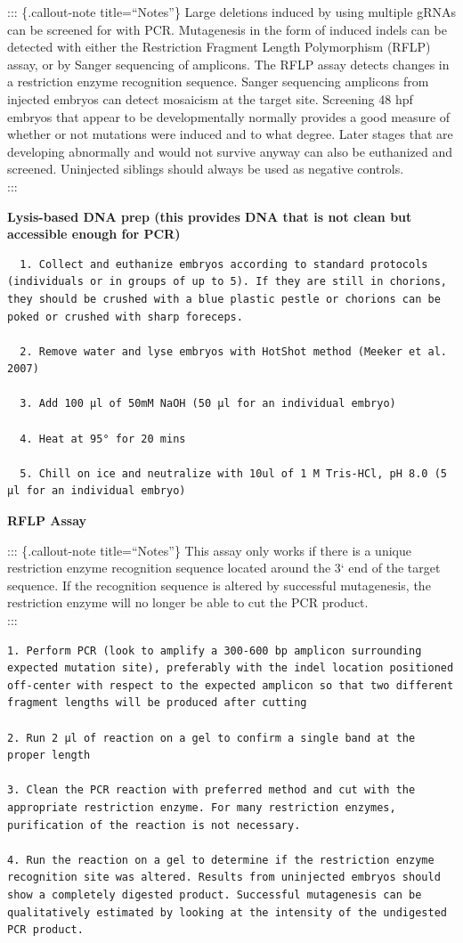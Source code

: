 \documentclass[
  letterpaper,
  DIV=11,
  numbers=noendperiod]{scrreprt}
\begin{document}
::: \{.callout-note title=``Notes''\} Large deletions induced by using
multiple gRNAs can be screened for with PCR. Mutagenesis in the form of
induced indels can be detected with either the Restriction Fragment
Length Polymorphism (RFLP) assay, or by Sanger sequencing of amplicons.
The RFLP assay detects changes in a restriction enzyme recognition
sequence. Sanger sequencing amplicons from injected embryos can detect
mosaicism at the target site. Screening 48 hpf embryos that appear to be
developmentally normally provides a good measure of whether or not
mutations were induced and to what degree. Later stages that are
developing abnormally and would not survive anyway can also be
euthanized and screened. Uninjected siblings should always be used as
negative controls.\\
:::

\textbf{Lysis-based DNA prep (this provides DNA that is not clean but
accessible enough for PCR)}

\begin{verbatim}
  1. Collect and euthanize embryos according to standard protocols (individuals or in groups of up to 5). If they are still in chorions, they should be crushed with a blue plastic pestle or chorions can be poked or crushed with sharp foreceps. 
  
  2. Remove water and lyse embryos with HotShot method (Meeker et al. 2007) 
  
  3. Add 100 µl of 50mM NaOH (50 µl for an individual embryo) 
  
  4. Heat at 95° for 20 mins 
  
  5. Chill on ice and neutralize with 10ul of 1 M Tris-HCl, pH 8.0 (5 µl for an individual embryo) 
\end{verbatim}

\textbf{RFLP Assay}

::: \{.callout-note title=``Notes''\} This assay only works if there is
a unique restriction enzyme recognition sequence located around the 3`
end of the target sequence. If the recognition sequence is altered by
successful mutagenesis, the restriction enzyme will no longer be able to
cut the PCR product.\\
:::

\begin{verbatim}
1. Perform PCR (look to amplify a 300-600 bp amplicon surrounding expected mutation site), preferably with the indel location positioned off-center with respect to the expected amplicon so that two different fragment lengths will be produced after cutting 

2. Run 2 µl of reaction on a gel to confirm a single band at the proper length 

3. Clean the PCR reaction with preferred method and cut with the appropriate restriction enzyme. For many restriction enzymes, purification of the reaction is not necessary. 

4. Run the reaction on a gel to determine if the restriction enzyme recognition site was altered. Results from uninjected embryos should show a completely digested product. Successful mutagenesis can be qualitatively estimated by looking at the intensity of the undigested PCR product. 
\end{verbatim}
\end{document}
